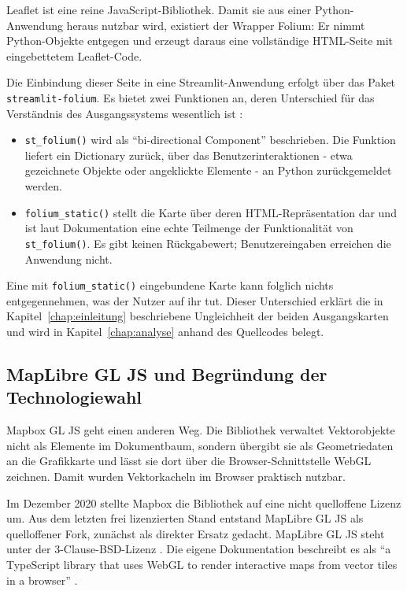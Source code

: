 \documentclass[12pt,a4paper]{report}
\begin{document}
Leaflet ist eine reine JavaScript-Bibliothek. Damit sie aus einer Python-Anwendung heraus
nutzbar wird, existiert der Wrapper Folium: Er nimmt Python-Objekte entgegen und erzeugt
daraus eine vollständige HTML-Seite mit eingebettetem Leaflet-Code.

Die Einbindung dieser Seite in eine Streamlit-Anwendung erfolgt über das Paket
\texttt{streamlit-folium}. Es bietet zwei Funktionen an, deren Unterschied für das
Verständnis des Ausgangssystems wesentlich ist \cite{StreamlitFolium}:

\begin{itemize}
    \item \texttt{st\_folium()} wird als \enquote{bi-directional Component} beschrieben.
    Die Funktion liefert ein Dictionary zurück, über das Benutzerinteraktionen - etwa
    gezeichnete Objekte oder angeklickte Elemente - an Python zurückgemeldet werden.
    \item \texttt{folium\_static()} stellt die Karte über deren HTML-Repräsentation dar und
    ist laut Dokumentation eine echte Teilmenge der Funktionalität von
    \texttt{st\_folium()}. Es gibt keinen Rückgabewert; Benutzereingaben erreichen die
    Anwendung nicht.
\end{itemize}

Eine mit \texttt{folium\_static()} eingebundene Karte kann folglich nichts entgegennehmen,
was der Nutzer auf ihr tut. Dieser Unterschied erklärt die in
Kapitel~\ref{chap:einleitung} beschriebene Ungleichheit der beiden Ausgangskarten und wird
in Kapitel~\ref{chap:analyse} anhand des Quellcodes belegt.

\subsection{MapLibre GL JS und Begründung der Technologiewahl}
\label{subsec:maplibre}

Mapbox GL JS geht einen anderen Weg. Die Bibliothek verwaltet Vektorobjekte nicht als
Elemente im Dokumentbaum, sondern übergibt sie als Geometriedaten an die Grafikkarte und
lässt sie dort über die Browser-Schnittstelle WebGL zeichnen. Damit wurden Vektorkacheln
im Browser praktisch nutzbar.

Im Dezember 2020 stellte Mapbox die Bibliothek auf eine nicht quelloffene Lizenz um. Aus
dem letzten frei lizenzierten Stand entstand MapLibre GL JS als quelloffener Fork, zunächst
als direkter Ersatz gedacht. MapLibre GL JS steht unter der 3-Clause-BSD-Lizenz
\cite{MapLibreRepo}. Die eigene Dokumentation beschreibt es als \enquote{a TypeScript
library that uses WebGL to render interactive maps from vector tiles in a browser}
\cite{MapLibreDocs}.
\end{document}
